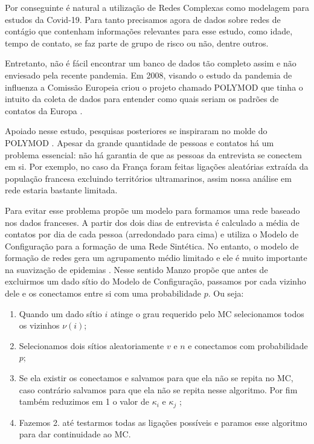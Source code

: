 \documentclass[12pt]{abnt-fisica11}%
\begin{document}
Por conseguinte é natural a utilização de Redes Complexas como modelagem para estudos da Covid-19. Para tanto precisamos agora de dados sobre redes de contágio que contenham informações relevantes para esse estudo, como idade, tempo de contato, se faz parte de grupo de risco ou não, dentre outros.

Entretanto, não é fácil encontrar um banco de dados tão completo assim e não enviesado pela recente pandemia. Em 2008, visando o estudo da pandemia de influenza a Comissão Europeia criou o projeto chamado POLYMOD \cite{POLYMOD} que tinha o intuito da coleta de dados para entender como quais seriam os padrões de contatos da Europa \cite{Mossong2008}.

Apoiado nesse estudo, pesquisas posteriores se inspiraram no molde do POLYMOD \cite{Belga2009,Belga2010,China,France,HongKong,Peru,Russia,Thailand,Vietnam,Zambia,Zimbabwe}. Apesar da grande quantidade de pessoas e contatos há um problema essencial: não há garantia de que as pessoas da entrevista se conectem em si. Por exemplo, no caso da França \cite{France} foram feitas ligações aleatórias extraída da população francesa excluindo territórios ultramarinos, assim nossa análise em rede estaria bastante limitada.

Para evitar esse problema \cite{Manzo2020} propõe um modelo para formamos uma rede baseado nos dados franceses. A partir dos dois dias de entrevista é calculado a média de contatos por dia de cada pessoa (arredondado para cima) e utiliza o Modelo de Configuração para a formação de uma Rede Sintética. No entanto, o modelo de formação de redes gera um agrupamento médio limitado e ele é muito importante na suavização de epidemias \cite{Block2020}. Nesse sentido Manzo propõe que antes de excluirmos um dado sítio do Modelo de Configuração, passamos por cada vizinho dele e os conectamos entre si com uma probabilidade $p$. Ou seja:

\begin{enumerate}
  \item Quando um dado sítio $i$ atinge o grau requerido pelo MC selecionamos todos os vizinhos $\nu(i)$;
  \item Selecionamos dois sítios aleatoriamente $v$ e $n$ e conectamos com probabilidade $p$;
  \item Se ela existir os conectamos e salvamos para que ela não se repita no MC, caso contrário salvamos para que ela não se repita nesse algoritmo. Por fim também reduzimos em 1 o valor de $\kappa_i$ e $\kappa_j$ ;
  \item Fazemos 2. até testarmos todas as ligações possíveis e paramos esse algoritmo para dar continuidade ao MC.
\end{enumerate}
\end{document}
